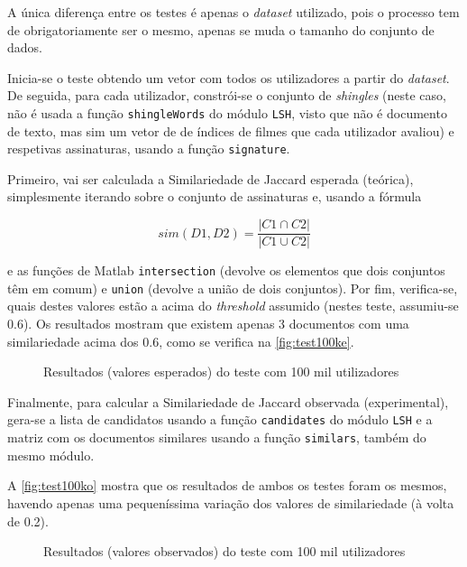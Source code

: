\documentclass[a4paper,11pt,openright,oneside]{report}
\begin{document}
A única diferença entre os testes é apenas o \textit{dataset} utilizado, pois o processo tem de obrigatoriamente ser o mesmo, apenas se muda o tamanho do conjunto de dados.

Inicia-se o teste obtendo um vetor com todos os utilizadores a partir do \textit{dataset}. De seguida, para cada utilizador, constrói-se o conjunto de \textit{shingles} (neste caso, não é usada a função \texttt{shingleWords} do módulo \texttt{LSH}, visto que não é documento de texto, mas sim um vetor de de índices de filmes que cada utilizador avaliou) e respetivas assinaturas, usando a função \texttt{signature}. 

Primeiro, vai ser calculada a Similariedade de Jaccard esperada (teórica), simplesmente iterando sobre o conjunto de assinaturas e, usando a fórmula 

$$ sim(D1, D2) = \frac{|C1\cap C2|}{|C1\cup C2|} $$

e as funções de Matlab \texttt{intersection} (devolve os elementos que dois conjuntos têm em comum) e \texttt{union} (devolve a união de dois conjuntos). Por fim, verifica-se, quais destes valores estão a acima do \textit{threshold} assumido (nestes teste, assumiu-se 0.6). Os resultados mostram que existem apenas 3 documentos com uma similariedade acima dos 0.6, como se verifica na \autoref{fig:test100ke}.

\begin{figure}[ht]	
\center
{}
\caption{Resultados (valores esperados) do teste com 100 mil utilizadores}
\label{fig:test100ke}
\end{figure}

Finalmente, para calcular a Similariedade de Jaccard observada (experimental), gera-se a lista de candidatos usando a função \texttt{candidates} do módulo \texttt{LSH} e a matriz com os documentos similares usando a função \texttt{similars}, também do mesmo módulo.

A \autoref{fig:test100ko} mostra que os resultados de ambos os testes foram os mesmos, havendo apenas uma pequeníssima variação dos valores de similariedade (à volta de 0.2).

\begin{figure}[ht]	
\center
{}
\caption{Resultados (valores observados) do teste com 100 mil utilizadores}
\label{fig:test100ko}
\end{figure}
\end{document}
